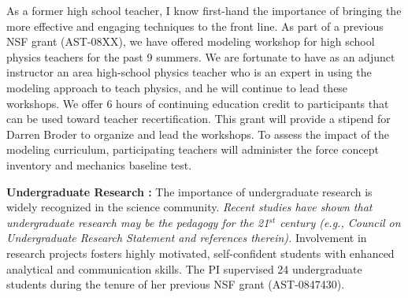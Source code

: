 \documentclass[11pt, preprint]{aastex}
\begin{document}
{As a former high school teacher, I know first-hand the importance of 
bringing the more effective and engaging techniques to the front line.
As part of a previous NSF grant (AST-08XX), we have offered 
modeling workshop for high school physics teachers for the past 9 summers.
We are fortunate
to have as an adjunct instructor an area high-school physics teacher who
is an expert in using the modeling approach to teach physics, and
he will continue to lead these workshops.  
We offer 6 hours of continuing education credit to participants 
that can be used toward teacher recertification.
This grant will provide a stipend for Darren Broder to organize and lead
the workshops.  
To assess the impact of the modeling curriculum, participating teachers
will administer the force concept inventory and mechanics baseline test.


{\bf Undergraduate Research  :}
The importance of undergraduate research is widely recognized
in the science community.
{\em Recent studies have shown that undergraduate research may be the
pedagogy for the 21$^{st}$ century (e.g., Council on Undergraduate Research
Statement and references therein).}
Involvement in research projects
fosters highly motivated, self-confident students with enhanced
analytical and communication skills. 
The PI supervised 24 undergraduate students during the tenure of her
previous NSF grant (AST-0847430).


}
\end{document}
